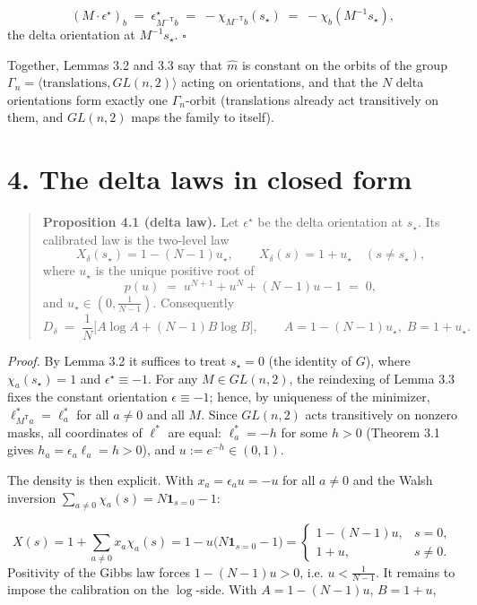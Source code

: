 \documentclass[11pt]{article}
\begin{document}
\[
(M\cdot\epsilon^\star)_b \;=\; \epsilon^\star_{M^{-\mathsf T}b}
\;=\; -\chi_{M^{-\mathsf T}b}(s_\star)
\;=\; -\chi_b(M^{-1}s_\star),
\]
the delta orientation at $M^{-1}s_\star$.  $\square$

Together, Lemmas 3.2 and 3.3 say that $\widehat m$ is constant on the orbits of the group $\Gamma_n = \langle \text{translations}, GL(n,2)\rangle$ acting on orientations, and that the $N$ delta orientations form exactly one $\Gamma_n$-orbit (translations already act transitively on them, and $GL(n,2)$ maps the family to itself).

\section*{4. The delta laws in closed form}
\begin{quote}
\textbf{Proposition 4.1 (delta law).}  Let $\epsilon^\star$ be the delta orientation at $s_\star$.  Its calibrated law is the two-level law
\[
X_\delta(s_\star) = 1 - (N-1)u_\star, \qquad
X_\delta(s) = 1 + u_\star \quad (s \ne s_\star),
\]
where $u_\star$ is the unique positive root of
\[
p(u) \;=\; u^{N+1} + u^N + (N-1)u - 1 \;=\; 0,
\]
and $u_\star \in (0, \tfrac1{N-1})$.  Consequently
\[
D_\delta \;=\; \frac1N\Big[A\log A + (N-1)B\log B\Big],
\qquad A = 1-(N-1)u_\star,\; B = 1+u_\star .
\]
\end{quote}
\emph{Proof.}  By Lemma 3.2 it suffices to treat $s_\star = 0$ (the identity of $G$), where $\chi_a(s_\star) = 1$ and $\epsilon^\star \equiv -1$.  For any $M \in GL(n,2)$, the reindexing of Lemma 3.3 fixes the constant orientation $\epsilon \equiv -1$; hence, by uniqueness of the minimizer, $\ell^\ast_{M^{\mathsf T}a} = \ell^\ast_a$ for all $a \ne 0$ and all $M$.  Since $GL(n,2)$ acts transitively on nonzero masks, all coordinates of $\ell^\ast$ are equal: $\ell^\ast_a = -h$ for some $h > 0$ (Theorem 3.1 gives $h_a = \epsilon_a\ell_a = h > 0$), and $u := e^{-h} \in (0,1)$.

The density is then explicit.  With $x_a = \epsilon_a u = -u$ for all $a \ne 0$ and the Walsh inversion $\sum_{a \ne 0}\chi_a(s) = N\mathbf{1}_{s=0} - 1$:

\[
X(s) = 1 + \sum_{a\ne0} x_a \chi_a(s)
= 1 - u\big(N\mathbf{1}_{s=0} - 1\big)
= \begin{cases}
1 - (N-1)u, & s = 0,\\
1 + u, & s \ne 0 .
\end{cases}
\]
Positivity of the Gibbs law forces $1 - (N-1)u > 0$, i.e. $u < \frac1{N-1}$.  It remains to impose the calibration on the $\log$-side.  With $A = 1-(N-1)u$, $B = 1+u$,
\end{document}
